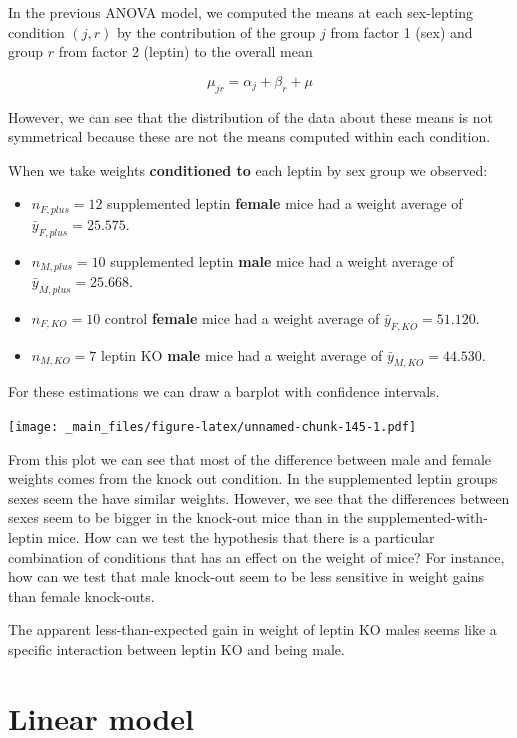 \documentclass[
]{book}
\begin{document}
In the previous ANOVA model, we computed the means at each sex-lepting condition \((j,r)\) by the contribution of the group \(j\) from factor 1 (sex) and group \(r\) from factor 2 (leptin) to the overall mean

\[\mu_{jr} = \alpha_{j} + \beta_{r} + \mu\]

However, we can see that the distribution of the data about these means is not symmetrical because these are not the means computed within each condition.

When we take weights \textbf{conditioned to} each leptin by sex group we observed:

\begin{itemize}
\item
  \(n_{F,plus}=12\) supplemented leptin \textbf{female} mice had a weight average of \(\bar{y}_{F,plus}=25.575\).
\item
  \(n_{M,plus}=10\) supplemented leptin \textbf{male} mice had a weight average of \(\bar{y}_{M,plus}=25.668\).
\item
  \(n_{F,KO}=10\) control \textbf{female} mice had a weight average of \(\bar{y}_{F,KO}=51.120\).
\item
  \(n_{M,KO}=7\) leptin KO \textbf{male} mice had a weight average of \(\bar{y}_{M,KO}=44.530\).
\end{itemize}

For these estimations we can draw a barplot with confidence intervals.

\texttt{[image: \_main\_files/figure-latex/unnamed-chunk-145-1.pdf]}

From this plot we can see that most of the difference between male and female weights comes from the knock out condition. In the supplemented leptin groups sexes seem the have similar weights. However, we see that the differences between sexes seem to be bigger in the knock-out mice than in the supplemented-with-leptin mice.
How can we test the hypothesis that there is a particular combination of conditions that has an effect on the weight of mice? For instance, how can we test that male knock-out seem to be less sensitive in weight gains than female knock-outs.

The apparent less-than-expected gain in weight of leptin KO males seems like a specific interaction between leptin KO and being male.

\hypertarget{linear-model-2}{%
\section{Linear model}\label{linear-model-2}}
\end{document}
